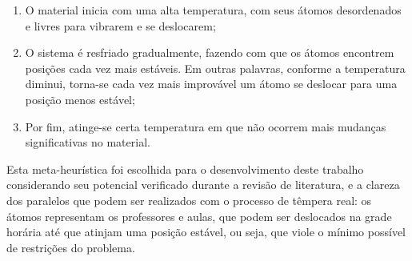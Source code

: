 \begin{enumerate}
	\item O material inicia com uma alta temperatura, com seus átomos desordenados e livres para vibrarem e se deslocarem;
	\item O sistema é resfriado gradualmente, fazendo com que os átomos encontrem posições cada vez mais estáveis. Em outras palavras, conforme a temperatura diminui, torna-se cada vez mais improvável um átomo se deslocar para uma posição menos estável;
	\item Por fim, atinge-se certa temperatura em que não ocorrem mais mudanças significativas no material. 
\end{enumerate}

Esta meta-heurística foi escolhida para o desenvolvimento deste trabalho considerando seu potencial verificado durante a revisão de literatura, e a clareza dos paralelos que podem ser realizados com o processo de têmpera real: os átomos representam os professores e aulas, que podem ser deslocados na grade horária até que atinjam uma posição estável, ou seja, que viole o mínimo possível de restrições do problema.


